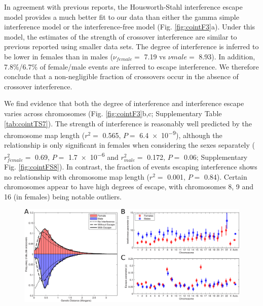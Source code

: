 In agreement with previous reports\cite{Housworth2003,Fledel-Alon2009}, the Housworth-Stahl
interference escape model provides a much better fit to our
data than either the gamma simple interference model or the
interference-free model (Fig. \ref{fig:cointF3}a). Under this model, the estimates
of the strength of crossover interference are similar to previous
reported using smaller data sets\cite{Fledel-Alon2009}. The degree of interference is
inferred to be lower in females than in males ($\nu_{female}=$ 7.19 vs
$\nu{male}=$ 8.93). In addition, 7.8\%/6.7\% of female/male events are
inferred to escape interference. We therefore conclude that a
non-negligible fraction of crossovers occur in the absence of
crossover interference.

We find evidence that both the degree of interference and
interference escape varies across chromosomes (Fig. \ref{fig:cointF3}b,c;
Supplementary Table \ref{tab:cointTS7}). The strength of interference is reasonably 
well predicted by the chromosome map length ($r^2=$ 0.565,
$P=$ \num{6.4e-9}), although the relationship is only significant in
females when considering the sexes separately ($r^2_{female}=$ 0.69,
$P=$ \num{1.7e-6} and $r^2_{male}=$ 0.172, $P=$ 0.06; Supplementary Fig. \ref{fig:cointFS8}).
In contrast, the fraction of events escaping interference shows no
relationship with chromosome map length ($r^2=$ 0.001, $P=$ 0.84).
Certain chromosomes appear to have high degrees of escape, with
chromosomes 8, 9 and 16 (in females) being notable outliers.

\begin{figure}[h]
    \includegraphics[width=\textwidth]{cointEscape/figs/Figure3.png}
    \vspace{-20pt}
\end{figure}

